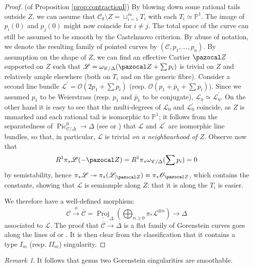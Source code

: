\documentclass{compositio}
\newcommand{\PP}{\mathbb P}
\newcommand{\OO}{\mathcal O}
\renewcommand{\to}{\rightarrow}
\newcommand{\dvr}{\Delta}
\newcommand{\Pic}{\operatorname{Pic}}
\theoremstyle{plain}
\theoremstyle{definition}
\theoremstyle{remark}
\newtheorem{rem}[thm]{Remark}
\begin{document}
\begin{proof}(of Proposition \ref{prop:contractionI})
 By blowing down some rational tails outside $Z$, we can assume that $\mathcal C_0\setminus Z=\sqcup_{i=1}^m T_i$ with each $T_i\simeq\PP^1$. The image of $p_i(0)$ and $p_j(0)$ might now coincide for $i\neq j$. The total space of the curve can still be assumed to be smooth by the Castelnuovo criterion. By abuse of notation, we denote the resulting family of pointed curves by $(\mathcal C,p_1,\ldots,p_n)$. By assumption on the shape of $Z$, we can find an effective Cartier $\pazocal Z$ supported on $Z$ such that $\mathcal L=\omega_{\mathcal C/\dvr}(\pazocal Z+\sum p_i)$ is trivial on $Z$ and relatively ample elsewhere (both on $T_i$ and on the generic fibre). Consider a second line bundle $\mathcal L^\prime=\OO(2p_1+\sum p_i)$ (resp. $\OO(p_1+\bar p_1+\sum p_i)$). Since we assumed $p_1$ to be Weierstrass (resp. $p_1$ and $\bar p_1$ to be conjugate), $\mathcal L_\eta\simeq\mathcal L^\prime_\eta$. On the other hand it is easy to see that the multi-degrees of $\mathcal L_0$ and $\mathcal L^\prime_0$ coincide, as $Z$ is unmarked and each rational tail is isomorphic to $\PP^1$; it follows from the separatedness of $\Pic^0_{\mathcal C/\dvr}\to\dvr$ (see \cite[p. 136]{Deligne-Gabber} or \cite[\S 9.4]{BLR}) that $\mathcal L$ and $\mathcal L^\prime$ are isomorphic line bundles, so that, in particular, $\mathcal L$ is trivial \emph{on a neighbourhood of $Z$}. Observe now that 
 \[R^1\pi_*\mathcal L(-{\pazocal Z})= R^1\pi_*\omega_{\mathcal C/\dvr}(\sum p_i)=0\]
 by semistability, hence $\pi_*\mathcal L\twoheadrightarrow \pi_*(\mathcal L_{|{\pazocal Z}})=\pi_*\OO_{\pazocal Z}$, which contains the constants, showing that $\mathcal L$ is semiample along $Z$; that it is along the $T_i$ is easier.
 
 We therefore have a well-defined  morphism:
 \[\mathcal C\xrightarrow{\phi}\overline{\mathcal C}=\underline{\operatorname{Proj}}_\dvr\left(\bigoplus_{n\geq 0}\pi_*\mathcal L^{\otimes n}\right)\to\dvr\]
 associated to $\mathcal L$. The proof that $\overline{\mathcal C}\to \dvr$ is a flat family of Gorenstein curves goes along the lines of \cite[Lemma 2.13]{SMY1} or \cite[Proposition 3.7.3.1]{RSPW1}. It is then clear from the classification that it contains a type $I_m$ (resp. $I\!I_m$) singularity.
 
\end{proof}

\begin{rem}
 It follows that genus two Gorenstein singularities are smoothable.
\end{rem}
\end{document}
